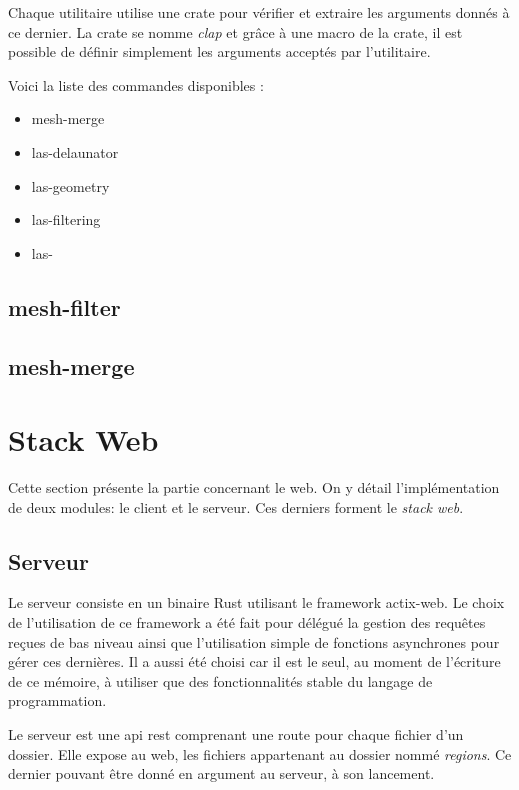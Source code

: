 Chaque utilitaire utilise une crate pour vérifier et extraire les arguments
donnés à ce dernier. La crate se nomme \textit{clap} et grâce à une macro de la
crate, il est possible de définir simplement les arguments acceptés par 
l'utilitaire.

Voici la liste des commandes disponibles :
\begin{itemize}
	\item mesh-merge
	\item las-delaunator
	\item las-geometry
	\item las-filtering
	\item las-
\end{itemize}

\subsection{mesh-filter}
\subsection{mesh-merge}

\section{Stack Web}

Cette section présente la partie concernant le web. On y détail l'implémentation
de deux modules: le client et le serveur.
Ces derniers forment le \textit{stack web}.

\subsection{Serveur}

Le serveur consiste en un binaire Rust utilisant le framework actix-web.
Le choix de l'utilisation de ce framework a été fait pour délégué la gestion des
requêtes reçues de bas niveau ainsi que l'utilisation simple de fonctions
asynchrones pour gérer ces dernières.
Il a aussi été choisi car il est le seul, au moment de l'écriture de ce mémoire,
à utiliser que des fonctionnalités stable du langage de programmation.

Le serveur est une \gls{api} \gls{rest} comprenant une route pour chaque fichier
d'un dossier.
Elle expose au web, les fichiers appartenant au dossier nommé \textit{regions}.
Ce dernier pouvant être donné en argument au serveur, à son lancement.

